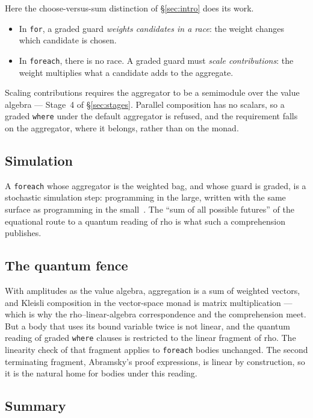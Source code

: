 \documentclass[11pt]{article}
\theoremstyle{definition}
\theoremstyle{plain}
\theoremstyle{remark}
\newcommand{\rhoc}{\textsf{rho}}
\newcommand{\fe}{\texttt{foreach}}
\begin{document}
Here the choose-versus-sum distinction of \S\ref{sec:intro} does its work.
\begin{itemize}[nosep]
\item In \texttt{for}, a graded guard \emph{weights candidates in a race}: the
weight changes which candidate is chosen.
\item In \fe{}, there is no race. A graded guard must \emph{scale
contributions}: the weight multiplies what a candidate adds to the aggregate.
\end{itemize}
Scaling contributions requires the aggregator to be a semimodule over the value
algebra --- Stage~4 of \S\ref{sec:stages}. Parallel composition has no scalars,
so a graded \texttt{where} under the default aggregator is refused, and the
requirement falls on the aggregator, where it belongs, rather than on the
monad.

\subsection{Simulation}

A \fe{} whose aggregator is the weighted bag, and whose guard is graded, is a
stochastic simulation step: programming in the large, written with the same
surface as programming in the small~\cite{WeightedGSLT}. The ``sum of all
possible futures'' of the equational route to a quantum reading of \rhoc{} is
what such a comprehension publishes.

\subsection{The quantum fence}

With amplitudes as the value algebra, aggregation is a sum of weighted vectors,
and Kleisli composition in the vector-space monad is matrix multiplication ---
which is why the rho--linear-algebra correspondence and the comprehension meet.
But a body that uses its bound variable twice is not linear, and the quantum
reading of graded \texttt{where} clauses is restricted to the linear fragment of
\rhoc{}. The linearity check of that fragment applies to \fe{} bodies unchanged.
The second terminating fragment, Abramsky's proof expressions, is linear by
construction, so it is the natural home for bodies under this reading.

\subsection{Summary}
\end{document}
